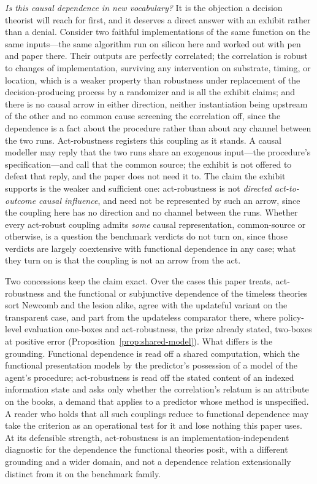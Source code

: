     \textit{Is this causal dependence in new vocabulary?} It is the objection a decision theorist will reach for first, and it deserves a direct answer with an exhibit rather than a denial. Consider two faithful implementations of the same function on the same inputs---the same algorithm run on silicon here and worked out with pen and paper there. Their outputs are perfectly correlated; the correlation is robust to changes of implementation, surviving any intervention on substrate, timing, or location, which is a weaker property than robustness under replacement of the decision-producing process by a randomizer and is all the exhibit claims; and there is no causal arrow in either direction, neither instantiation being upstream of the other and no common cause screening the correlation off, since the dependence is a fact about the procedure rather than about any channel between the two runs. Act-robustness registers this coupling as it stands. A causal modeller may reply that the two runs share an exogenous input---the procedure's specification---and call that the common source; the exhibit is not offered to defeat that reply, and the paper does not need it to. The claim the exhibit supports is the weaker and sufficient one: act-robustness is not \emph{directed act-to-outcome causal influence}, and need not be represented by such an arrow, since the coupling here has no direction and no channel between the runs. Whether every act-robust coupling admits \emph{some} causal representation, common-source or otherwise, is a question the benchmark verdicts do not turn on, since those verdicts are largely coextensive with functional dependence in any case; what they turn on is that the coupling is not an arrow from the act.

    Two concessions keep the claim exact. Over the cases this paper treats, act-robustness and the functional or subjunctive dependence of the timeless theories sort Newcomb and the lesion alike, agree with the updateful variant on the transparent case, and part from the updateless comparator there, where policy-level evaluation one-boxes and act-robustness, the prize already stated, two-boxes at positive error (Proposition~\ref{prop:shared-model}). What differs is the grounding. Functional dependence is read off a shared computation, which the functional presentation models by the predictor's possession of a model of the agent's procedure; act-robustness is read off the stated content of an indexed information state and asks only whether the correlation's relatum is an attribute on the books, a demand that applies to a predictor whose method is unspecified. A reader who holds that all such couplings reduce to functional dependence may take the criterion as an operational test for it and lose nothing this paper uses. At its defensible strength, act-robustness is an implementation-independent diagnostic for the dependence the functional theories posit, with a different grounding and a wider domain, and not a dependence relation extensionally distinct from it on the benchmark family.

